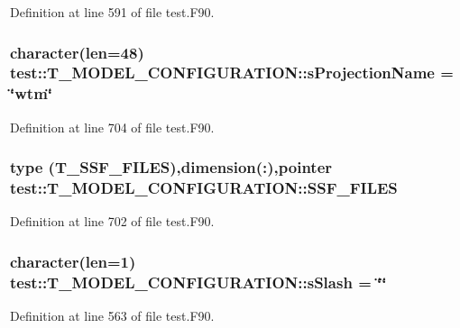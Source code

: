 Definition at line 591 of file test.F90.

\hypertarget{typetest_1_1_t___m_o_d_e_l___c_o_n_f_i_g_u_r_a_t_i_o_n_a98688f5654c8ceccaac435e839729246}{
\subsubsection[{sProjectionName}]{\setlength{\rightskip}{0pt plus 5cm}character(len=48) {\bf test::T\_\-MODEL\_\-CONFIGURATION::sProjectionName} = \char`\"{}wtm\char`\"{}}}
\label{typetest_1_1_t___m_o_d_e_l___c_o_n_f_i_g_u_r_a_t_i_o_n_a98688f5654c8ceccaac435e839729246}


Definition at line 704 of file test.F90.

\hypertarget{typetest_1_1_t___m_o_d_e_l___c_o_n_f_i_g_u_r_a_t_i_o_n_a70158cc60f405c3d5e5f08d3b99b0a5b}{
\subsubsection[{SSF\_\-FILES}]{\setlength{\rightskip}{0pt plus 5cm}type ({\bf T\_\-SSF\_\-FILES}),dimension(:),pointer {\bf test::T\_\-MODEL\_\-CONFIGURATION::SSF\_\-FILES}}}
\label{typetest_1_1_t___m_o_d_e_l___c_o_n_f_i_g_u_r_a_t_i_o_n_a70158cc60f405c3d5e5f08d3b99b0a5b}


Definition at line 702 of file test.F90.

\hypertarget{typetest_1_1_t___m_o_d_e_l___c_o_n_f_i_g_u_r_a_t_i_o_n_a189e8cdf84807cb1cd85d11f7c542c34}{
\subsubsection[{sSlash}]{\setlength{\rightskip}{0pt plus 5cm}character(len=1) {\bf test::T\_\-MODEL\_\-CONFIGURATION::sSlash} = \char`\"{}\char`\"{}}}
\label{typetest_1_1_t___m_o_d_e_l___c_o_n_f_i_g_u_r_a_t_i_o_n_a189e8cdf84807cb1cd85d11f7c542c34}


Definition at line 563 of file test.F90.

